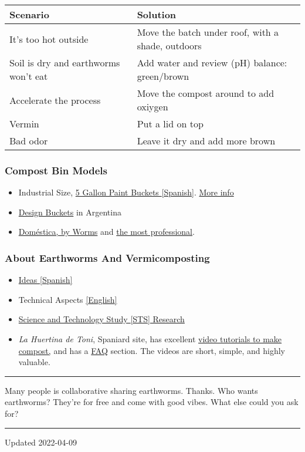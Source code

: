 \begin{longtable}[]{@{}ll@{}}
\toprule
{Scenario} & {Solution}\tabularnewline
\midrule
\endhead
It's too hot outside & Move the batch under roof, with a shade,
outdoors\tabularnewline
Soil is dry and earthworms won't eat & Add water and review (pH)
balance: green/brown\tabularnewline
Accelerate the process & Move the compost around to add
oxiygen\tabularnewline
Vermin & Put a lid on top\tabularnewline
Bad odor & Leave it dry and add more brown\tabularnewline
\bottomrule
\end{longtable}

\hypertarget{modelos-de-compostera-para-armar-y-para-comprar-armada}{%
\subsubsection{Compost Bin
Models}\label{modelos-de-compostera-para-armar-y-para-comprar-armada}}

\begin{itemize}
\tightlist
\item
  Industrial Size, \href{../docs/tachos.pdf}{5 Gallon Paint Buckets
  {[}Spanish{]}}.
  \href{http://www.corraldebustos.gov.ar/municipalidad.asp?id=183}{More
  info}
\item
  \href{https://www.micompas.com/}{Design Buckets} in Argentina
\item
  \href{https://wormsargentina.com/producto/reciclador-domestico/}{Doméstica,
  by Worms} and
  \href{https://wormsargentina.com/producto/worms-smart/}{the most
  professional}.
\end{itemize}

\hypertarget{muxe1s-info}{%
\subsubsection{About Earthworms And Vermicomposting}\label{muxe1s-info}}

\begin{itemize}
\tightlist
\item
  \href{http://ramoneando.com/citas/gabetta-jose.html}{Ideas
  {[}Spanish{]}}
\item
  Technical Aspects
  \href{http://ir.library.oregonstate.edu/xmlui/bitstream/handle/1957/23949/em9034.pdf}{{[}English{]}}
\item
  \href{https://www.environmentandsociety.org/mml/compost-politics-experimenting-togetherness-vermicomposting}{Science
  and Technology Study {[}STS{]} Research}
\item
  \emph{La Huertina de Toni}, Spaniard site, has excellent
  \href{http://www.lahuertinadetoni.es/como-hacer-humus-de-lombriz/}{video
  tutorials to make compost,} and has a
  \href{http://www.lahuertinadetoni.es/lombrices-dudas-mas-frecuentes/}{FAQ}
  section. The videos are short, simple, and highly valuable.
\end{itemize}

\begin{center}\rule{0.5\linewidth}{\linethickness}\end{center}

Many people is collaborative sharing earthworms. Thanks. Who wants
earthworms? They're for free and come with good vibes. What else could
you ask for?

\begin{center}\rule{0.5\linewidth}{\linethickness}\end{center}

Updated 2022-04-09
